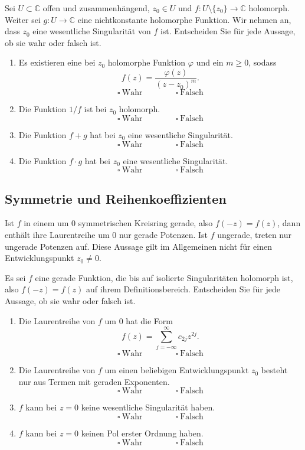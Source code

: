 \documentclass[11pt,a4paper]{article}
\newcommand{\C}{\mathbb C}
\newcommand{\1}{\mathbf 1}
\begin{document}
{\begin{mcbox}[title=MC-Training: wesentliche Singularitäten]
Sei $U\subset\C$ offen und zusammenhängend, $z_0\in U$ und
$f:U\setminus\{z_0\}\to\C$ holomorph. Weiter sei $g:U\to\C$ eine
nichtkonstante holomorphe Funktion. Wir nehmen an, dass $z_0$ eine wesentliche
Singularität von $f$ ist. Entscheiden Sie für jede Aussage, ob sie wahr oder
falsch ist.
\begin{enumerate}
\item Es existieren eine bei $z_0$ holomorphe Funktion $\varphi$ und ein
$m\geq0$, sodass
\[
f(z)=\frac{\varphi(z)}{(z-z_0)^m}.
\]
\[
\square\ \text{Wahr}\qquad\qquad\square\ \text{Falsch}
\]
\item Die Funktion $1/f$ ist bei $z_0$ holomorph.
\[
\square\ \text{Wahr}\qquad\qquad\square\ \text{Falsch}
\]
\item Die Funktion $f+g$ hat bei $z_0$ eine wesentliche Singularität.
\[
\square\ \text{Wahr}\qquad\qquad\square\ \text{Falsch}
\]
\item Die Funktion $f\cdot g$ hat bei $z_0$ eine wesentliche Singularität.
\[
\square\ \text{Wahr}\qquad\qquad\square\ \text{Falsch}
\]
\end{enumerate}
\end{mcbox}

\subsection{Symmetrie und Reihenkoeffizienten}
Ist $f$ in einem um $0$ symmetrischen Kreisring gerade, also $f(-z)=f(z)$, dann
enthält ihre Laurentreihe um $0$ nur gerade Potenzen. Ist $f$ ungerade, treten nur
ungerade Potenzen auf. Diese Aussage gilt im Allgemeinen nicht für einen
Entwicklungspunkt $z_0\neq0$.

\begin{mcbox}[title=MC-Training: gerade Funktionen und Laurentreihen]
Es sei $f$ eine gerade Funktion, die bis auf isolierte Singularitäten holomorph
ist, also $f(-z)=f(z)$ auf ihrem Definitionsbereich. Entscheiden Sie für jede
Aussage, ob sie wahr oder falsch ist.
\begin{enumerate}
\item Die Laurentreihe von $f$ um $0$ hat die Form
\[
f(z)=\sum_{j=-\infty}^{\infty}c_{2j}z^{2j}.
\]
\[
\square\ \text{Wahr}\qquad\qquad\square\ \text{Falsch}
\]
\item Die Laurentreihe von $f$ um einen beliebigen Entwicklungspunkt $z_0$
besteht nur aus Termen mit geraden Exponenten.
\[
\square\ \text{Wahr}\qquad\qquad\square\ \text{Falsch}
\]
\item $f$ kann bei $z=0$ keine wesentliche Singularität haben.
\[
\square\ \text{Wahr}\qquad\qquad\square\ \text{Falsch}
\]
\item $f$ kann bei $z=0$ keinen Pol erster Ordnung haben.
\[
\square\ \text{Wahr}\qquad\qquad\square\ \text{Falsch}
\]
\end{enumerate}
\end{mcbox}

}
\end{document}
